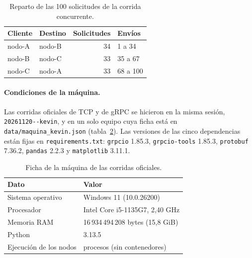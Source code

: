 \documentclass[11pt,a4paper]{article}
\begin{document}
\begin{table}[htbp]
  \centering
  \caption{Reparto de las 100 solicitudes de la corrida concurrente.}
  \label{tab:concurrencia}
  \begin{tabular}{llrl}
    \toprule
    Cliente & Destino & Solicitudes & Envíos \\
    \midrule
    nodo-A & nodo-B & 34 & 1 a 34 \\
    nodo-B & nodo-C & 33 & 35 a 67 \\
    nodo-C & nodo-A & 33 & 68 a 100 \\
    \bottomrule
  \end{tabular}
\end{table}

\paragraph{Condiciones de la máquina.} Las corridas oficiales de TCP y de gRPC se hicieron
en la misma sesión, \texttt{20261120--\allowbreak kevin}, y en un solo equipo cuya ficha está en
\texttt{data/\allowbreak maquina\_\allowbreak kevin.json} (tabla~\ref{tab:maquina}). Las versiones de las cinco
dependencias están fijas en \texttt{requirements.txt}: \texttt{grpcio} 1.85.3,
\texttt{grpcio-tools} 1.85.3, \texttt{protobuf} 7.36.2, \texttt{pandas} 2.2.3 y
\texttt{matplotlib} 3.11.1.

\begin{table}[htbp]
  \centering
  \caption{Ficha de la máquina de las corridas oficiales.}
  \label{tab:maquina}
  \begin{tabular}{ll}
    \toprule
    Dato & Valor \\
    \midrule
    Sistema operativo & Windows 11 (10.0.26200) \\
    Procesador & Intel Core i5-1135G7, 2,40 GHz \\
    Memoria RAM & 16\,934\,494\,208 bytes (15,8 GiB) \\
    Python & 3.13.5 \\
    Ejecución de los nodos & procesos (sin contenedores) \\
    \bottomrule
  \end{tabular}
\end{table}
\end{document}
